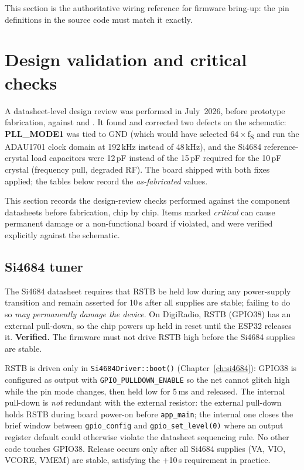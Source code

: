 This section is the authoritative wiring reference for firmware bring-up:
the pin definitions in the source code must match it exactly.

\section{Design validation and critical checks}
\label{sec:hw-validation}

A datasheet-level design review was performed in July~2026, before prototype
fabrication, against  and
. It found and corrected two
defects on the schematic: \textbf{PLL\_MODE1} was tied to GND (which would
have selected 64\,$\times$\,f\textsubscript{S} and run the ADAU1701 clock
domain at 192\,kHz instead of 48\,kHz), and the Si4684 reference-crystal
load capacitors were 12\,pF instead of the 15\,pF required for the
10\,pF crystal (frequency pull, degraded RF). The board shipped with both
fixes applied; the tables below record the \emph{as-fabricated} values.

This section records the design-review checks performed against the
component datasheets before fabrication, chip by chip. Items marked
\emph{critical} can cause permanent damage or a non-functional board if
violated, and were verified explicitly against the schematic.

\subsection{Si4684 tuner}
\label{sec:hw-val-si4684}

\begin{drcaution}
The Si4684 datasheet requires that RSTB be held low during any power-supply
transition and remain asserted for 10\,\textmu s after all supplies are
stable; failing to do so \emph{may permanently damage the device}. On
DigiRadio, RSTB (GPIO38) has an external pull-down, so the chip powers up
held in reset until the ESP32 releases it. \textbf{Verified.} The firmware
must not drive RSTB high before the Si4684 supplies are stable.
\end{drcaution}

\begin{drnote}
RSTB is driven only in \texttt{Si4684Driver::boot()}
(Chapter~\ref{ch:si4684}): GPIO38 is configured as output with
\texttt{GPIO\_PULLDOWN\_ENABLE} so the net cannot glitch high while the pin
mode changes, then held low for 5\,ms and released. The internal pull-down
is \emph{not} redundant with the external resistor: the external pull-down
holds RSTB during board power-on before \texttt{app\_main}; the internal one
closes the brief window between \texttt{gpio\_config} and
\texttt{gpio\_set\_level(0)} where an output register default could otherwise
violate the datasheet sequencing rule. No other code touches GPIO38. Release
occurs only after all Si4684 supplies (VA, VIO, VCORE, VMEM) are stable,
satisfying the +10\,\textmu s requirement in practice.
\end{drnote}

